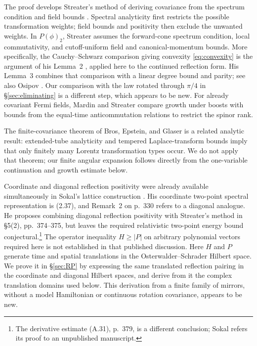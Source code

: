 The proof develops Streater's method of deriving covariance from
the spectrum condition and field bounds
\cite[Theorem, p.~119]{Streater}. Spectral analyticity first restricts
the possible transformation weights; field bounds and positivity then
exclude the unwanted weights. In $P(\phi)_2$, Streater assumes the
forward-cone spectrum condition, local commutativity, and cutoff-uniform
field and canonical-momentum bounds. More specifically,
the Cauchy--Schwarz comparison giving convexity
\eqref{eq:convexity} is the argument of his Lemma~2
\cite[pp.~113--114]{Streater}, applied here to the continued reflection
form. His Lemma~3 \cite[p.~114]{Streater} combines that comparison
with a linear degree bound and parity; see also Osipov
\cite[p.~115]{O}. Our comparison with the law rotated through $\pi/4$
in \S\ref{sec:eliminating} is a different step, which appears to be new.
For already covariant Fermi fields, Mardin and Streater
\cite[(4)--(6), pp.~82--83]{MardinStreater} compare growth under boosts
with bounds from the equal-time anticommutation relations to restrict
the spinor rank.

The finite-covariance theorem of Bros, Epstein, and Glaser
\cite[Theorem~1]{BEG} is a related analytic result: extended-tube
analyticity and tempered Laplace-transform bounds imply that only
finitely many Lorentz transformation types occur. We do not apply
that theorem; our finite angular expansion follows directly from the
one-variable continuation and growth estimate below.

Coordinate and diagonal reflection positivity were already available
simultaneously in Sokal's lattice construction
\cite[pp.~328--330]{Sokal}. His coordinate two-point spectral
representation is (2.37), and Remark~2 on p.~330 refers to a diagonal
analogue. He proposes combining diagonal reflection positivity with
Streater's method in \S5(2), pp.~374--375, but leaves the required
relativistic two-point energy bound conjectural.\footnote{The derivative
estimate (A.31), p.~379, is a different conclusion; Sokal refers its
proof to an unpublished manuscript.}
The operator inequality $H\geq|P|$ on arbitrary polynomial vectors
required here is not established in that published discussion. Here
$H$ and $P$ generate time and spatial translations in the
Osterwalder--Schrader Hilbert space. We prove it in \S\ref{sec:RP} by
expressing the same translated reflection pairing in the coordinate
and diagonal Hilbert spaces, and derive from it the complex translation
domains used below. This derivation from a finite family of mirrors,
without a model Hamiltonian or continuous rotation covariance, appears
to be new.

